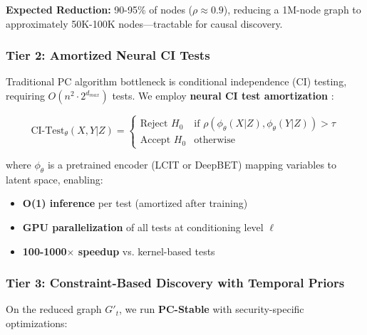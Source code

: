 \documentclass[conference]{IEEEtran}
\begin{document}
\textbf{Expected Reduction:} 90-95\% of nodes ($\rho \approx 0.9$), reducing a 1M-node graph to approximately 50K-100K nodes—tractable for causal discovery.

\subsubsection{Tier 2: Amortized Neural CI Tests}

Traditional PC algorithm bottleneck is conditional independence (CI) testing, requiring $O(n^2 \cdot 2^{d_{max}})$ tests. We employ \textbf{neural CI test amortization} \cite{lcit2023,deepbet2025}:

\begin{equation}
\text{CI-Test}_{\theta}(X, Y | Z) = \begin{cases}
    \text{Reject } H_0 & \text{if } \rho(\phi_\theta(X|Z), \phi_\theta(Y|Z)) > \tau \\
    \text{Accept } H_0 & \text{otherwise}
\end{cases}
\end{equation}

where $\phi_\theta$ is a pretrained encoder (LCIT or DeepBET) mapping variables to latent space, enabling:
\begin{itemize}
    \item \textbf{O(1) inference} per test (amortized after training)
    \item \textbf{GPU parallelization} of all tests at conditioning level $\ell$
    \item \textbf{100-1000$\times$ speedup} vs. kernel-based tests
\end{itemize}

\subsubsection{Tier 3: Constraint-Based Discovery with Temporal Priors}

On the reduced graph $G'_t$, we run \textbf{PC-Stable} \cite{pcstable} with security-specific optimizations:
\end{document}
